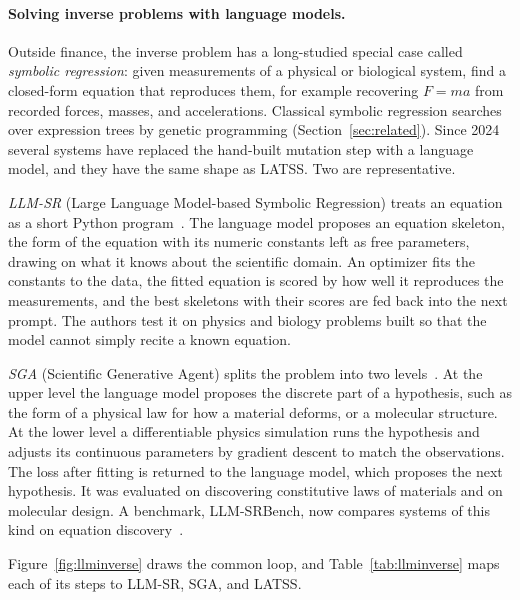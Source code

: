 \documentclass[11pt]{article}
\begin{document}
\paragraph{Solving inverse problems with language models.} Outside finance, the inverse problem has a
long-studied special case called \emph{symbolic regression}: given measurements of a physical or
biological system, find a closed-form equation that reproduces them, for example recovering
$F = m a$ from recorded forces, masses, and accelerations. Classical symbolic regression searches
over expression trees by genetic programming (Section~\ref{sec:related}). Since 2024 several systems
have replaced the hand-built mutation step with a language model, and they have the same shape as LATSS.
Two are representative.

\emph{LLM-SR} (Large Language Model-based Symbolic Regression) treats an equation as a short Python
program~\cite{llmsr}. The language model proposes an equation skeleton, the form of the equation with its
numeric constants left as free parameters, drawing on what it knows about the scientific domain. An
optimizer fits the constants to the data, the fitted equation is scored by how well it reproduces the
measurements, and the best skeletons with their scores are fed back into the next prompt. The authors
test it on physics and biology problems built so that the model cannot simply recite a known equation.

\emph{SGA} (Scientific Generative Agent) splits the problem into two levels~\cite{sga}. At the upper
level the language model proposes the discrete part of a hypothesis, such as the form of a physical law
for how a material deforms, or a molecular structure. At the lower level a differentiable physics
simulation runs the hypothesis and adjusts its continuous parameters by gradient descent to match the
observations. The loss after fitting is returned to the language model, which proposes the next
hypothesis. It was evaluated on discovering constitutive laws of materials and on molecular design. A
benchmark, LLM-SRBench, now compares systems of this kind on equation discovery~\cite{llmsrbench}.

Figure~\ref{fig:llminverse} draws the common loop, and Table~\ref{tab:llminverse} maps each of its steps
to LLM-SR, SGA, and LATSS.
\end{document}
